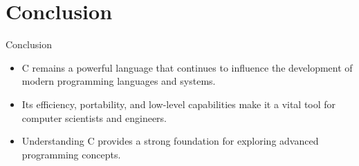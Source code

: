 \documentclass{beamer}
\begin{document}
\section{Conclusion}
\begin{frame}{Conclusion}
    \begin{itemize}
        \item C remains a powerful language that continues to influence the development of modern programming languages and systems.
        \item Its efficiency, portability, and low-level capabilities make it a vital tool for computer scientists and engineers.
        \item Understanding C provides a strong foundation for exploring advanced programming concepts.
    \end{itemize}
\end{frame}
\end{document}
